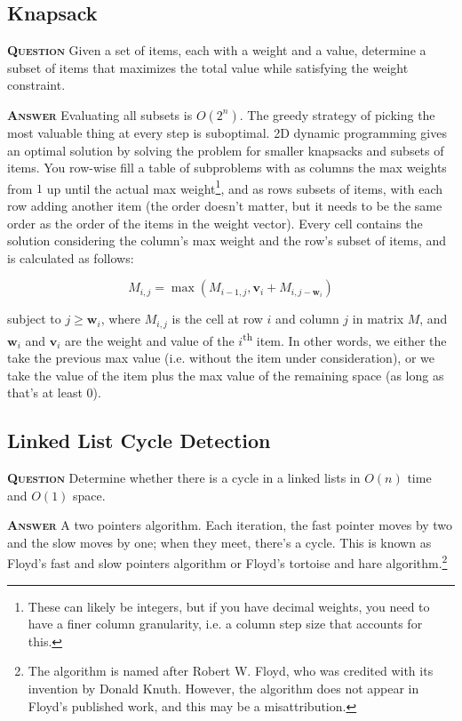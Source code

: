 \documentclass[table, xcdraw]{article}%
\begin{document}
\subsection{Knapsack}

\textsc{\textbf{Question}} Given a set of items, each with a weight and a value, determine a subset of items that maximizes the total value while satisfying the weight constraint.

\textsc{\textbf{Answer}} Evaluating all subsets is $O(2^n)$. The greedy strategy of picking the most valuable thing at every step is suboptimal. 2D dynamic programming gives an optimal solution by solving the problem for smaller knapsacks and subsets of items. You row-wise fill a table of subproblems with as columns the max weights from $1$ up until the actual max weight\footnote{These can likely be integers, but if you have decimal weights, you need to have a finer column granularity, i.e. a column step size that accounts for this.}, and as rows subsets of items, with each row adding another item (the order doesn't matter, but it needs to be the same order as the order of the items in the weight vector). Every cell contains the solution considering the column's max weight and the row's subset of items, and is calculated as follows:

\begin{equation*}
    M_{i,j} = \max(M_{i-1,j}, \mathbf{v}_i + M_{i,j-\mathbf{w}_i})
\end{equation*}

subject to $j \geq \mathbf{w}_i$, where $M_{i,j}$ is the cell at row $i$ and column $j$ in matrix $M$, and $\mathbf{w}_i$ and $\mathbf{v}_i$ are the weight and value of the $i$\textsuperscript{th} item. In other words, we either the take the previous max value (i.e. without the item under consideration), or we take the value of the item plus the max value of the remaining space (as long as that's at least $0$).

\subsection{Linked List Cycle Detection}

\textsc{\textbf{Question}} Determine whether there is a cycle in a linked lists in $O(n)$ time and $O(1)$ space.

\textsc{\textbf{Answer}} A two pointers algorithm. Each iteration, the fast pointer moves by two and the slow moves by one; when they meet, there's a cycle. This is known as Floyd's fast and slow pointers algorithm or Floyd's tortoise and hare algorithm.\footnote{The algorithm is named after Robert W. Floyd, who was credited with its invention by Donald Knuth. However, the algorithm does not appear in Floyd's published work, and this may be a misattribution.}
\end{document}
